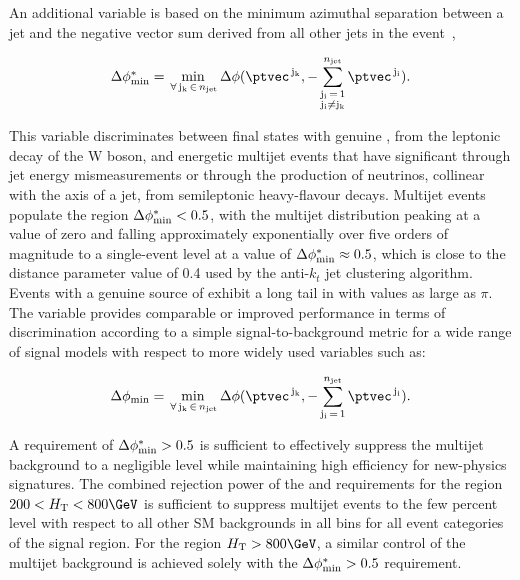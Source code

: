 An additional variable is based on the minimum azimuthal separation
between a jet and the negative vector \ptvec sum derived from all
other jets in the event~\cite{RA1Paper},


\begin{equation}
  \bdphi = \min_{\,\forall\, \mathrm{j_k} \,\in\, \njet}
  \Delta\phi( \ptvec^{\,\mathrm{j_k}}, 
  -\sum_{\substack{\mathrm{j_i}\, =\, 1 \\ \mathrm{j_i} \ne \mathrm{j_k}}}^{\njet}
  \ptvec^{\,\mathrm{j_i}}).   
  \label{eq:bdphi}
\end{equation}

This variable discriminates between final states with genuine
\ptvecmiss, \eg from the leptonic decay of the W boson, and energetic
multijet events that have significant \ptvecmiss through jet energy
mismeasurements or through the production of neutrinos, collinear with
the axis of a jet, from semileptonic heavy-flavour decays. Multijet
events populate the region $\mbox{$\Delta\phi^{*}_{\rm min}$} < 0.5$, with the multijet
distribution peaking at a value of zero and falling approximately
exponentially over five orders of magnitude to a single-event level at
a value of $\mbox{$\Delta\phi^{*}_{\rm min}$} \approx 0.5$, which is close to the distance
parameter value of 0.4 used by the anti-$k_t$ jet clustering
algorithm. Events with a genuine source of \ptvecmiss exhibit a long
tail in \bdphi with values as large as $\pi$. The \bdphi variable
provides comparable or improved performance in terms of discrimination
according to a simple signal-to-background metric for a wide range of
signal models with respect to more widely used variables such as:

\begin{equation}
  \Delta\phi_\text{min} = \min_{\,\forall\, \mathrm{j_k} \,\in\, \njet}
  \Delta\phi(\ptvec^{\,\mathrm{j_k}}, -\sum_{\mathrm{j_i}\, =\, 1}^{\njet}
  \ptvec^{\,\mathrm{j_i}}).
  \label{eq:dphi}
\end{equation}


A requirement of $\mbox{$\Delta\phi^{*}_{\rm min}$} > 0.5$ is sufficient to effectively suppress
the multijet background to a negligible level while maintaining high
efficiency for new-physics signatures. The combined rejection power of
the \alphat and \bdphi requirements for the region $200 < \scalht <
800\GeV$ is sufficient to suppress multijet events to the few percent
level with respect to all other SM backgrounds in all \scalht bins for
all event categories of the signal region. For the region $\scalht >
800\GeV$, a similar control of the multijet background is achieved
solely with the $\mbox{$\Delta\phi^{*}_{\rm min}$} > 0.5$ requirement.

